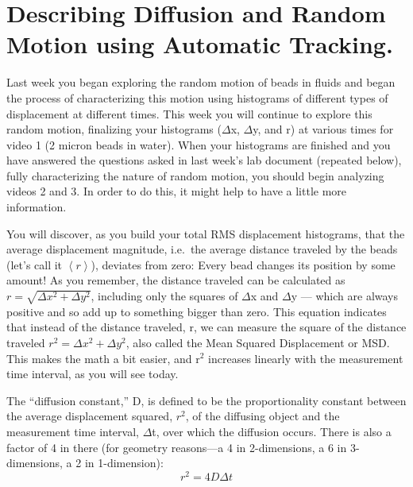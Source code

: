 \newpage

\section{Describing Diffusion and Random Motion using Automatic Tracking.}
Last week you began exploring the random motion of beads in fluids and began the process of characterizing this motion using histograms of different types of displacement at different times. 
This week you will continue to explore this random motion, finalizing your histograms ($\Delta$x, $\Delta$y, and r) at various times for video 1 (2 micron beads in water). 
When your histograms are finished and you have answered the questions asked in last week's lab document (repeated below), fully characterizing the nature of random motion, you should begin analyzing videos 2 and 3. 
In order to do this, it might help to have a little more information. 
\par 
You will discover, as you build your total RMS displacement histograms, that the average displacement magnitude, i.e.\ the average distance traveled by the beads (let’s call it $\left< r \right>$), deviates from zero: Every bead changes its position by some amount! 
As you remember, the distance traveled can be calculated as $r = \sqrt{\Delta x^{2}+\Delta y^{2}}$, including only the squares of $\Delta$x and $\Delta$y — which are always positive and so add up to something bigger than zero. 
This equation indicates that instead of the distance traveled, r, we can measure the square of the distance traveled $r^{2} = \Delta x^{2} + \Delta y^{2}$, also called the Mean Squared Displacement or MSD. 
This makes the math a bit easier, and r$^{2}$ increases linearly with the measurement time interval, as you will see today. 
\par 
The ``diffusion constant,'' D, is defined to be the proportionality constant between the average displacement squared, $r^{2}$, of the diffusing object and the measurement time interval, $\Delta$t, over which the diffusion occurs. 
There is also a factor of 4 in there (for geometry reasons—a 4 in 2-dimensions, a 6 in 3-dimensions, a 2 in 1-dimension):
\begin{equation}
r^{2} = 4 D \Delta t
\end{equation} 
